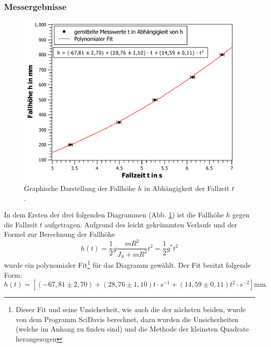 		\subsubsection{Messergebnisse}	
			
			\begin{figure}[ht]
				\centering
				\includegraphics[width=\textwidth]{h-gegen-t.pdf}
				\caption{Graphische Darstellung der Fallhöhe $h$ in Abhängigkeit der Fallzeit $t$.}
				\label{fig:hgegent}	
			\end{figure}
			In dem Ersten der drei folgenden Diagrammen (Abb. \ref{fig:hgegent}) ist die Fallhöhe $h$ gegen die Fallzeit $t$ aufgetragen.
			Aufgrund des leicht gekrümmten Verlaufs und der Formel zur Berechnung der Fallhöhe
			\begin{equation}
				h(t) = \frac{1}{2}g \frac{mR^2}{J_S + mR^2} t^2 = \frac{1}{2}g^{*}t^2 \label{eq:Fallbeschleunigung}
			\end{equation}
			wurde ein polynomialer Fit\footnote{Dieser Fit und seine Unsicherheit, wie auch die der nächsten beiden, wurde von dem Programm SciDavis berechnet, dazu wurden die Unsicherheiten (welche im Anhang zu finden sind) und die Methode der kleinsten Quadrate herangezogen} für das Diagramm gewählt.
			Der Fit besitzt folgende Form: 
			\begin{equation*}
				h(t) = [(-67,81\pm 2,70)+(28,76\pm 1,10)t\cdot\si{s^{-1}}+(14,59\pm 0,11)t^2\cdot\si{s^{-2}}]\si{\mm}.
			\end{equation*} 
